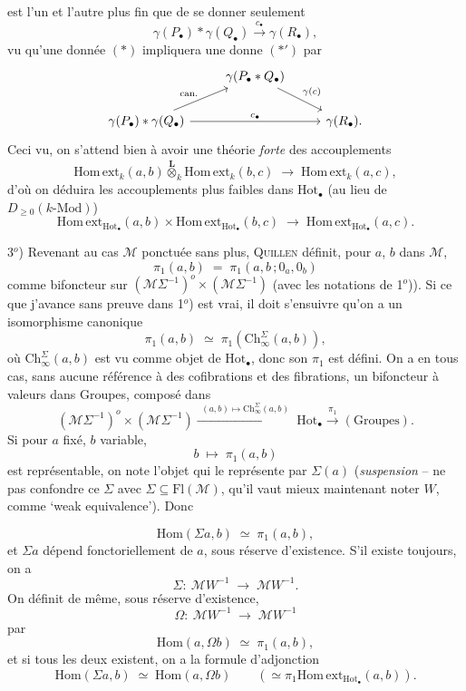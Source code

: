 \documentclass[11pt]{article}
\newcommand{\printedpage}[1]{\marginpar{\footnotesize p.~#1}}
\newcommand{\msp}[1]{\marginpar{\footnotesize [#1]}}
\newcommand{\M}{\mathcal{M}}
\newcommand{\Hot}{\mathrm{Hot}}
\newcommand{\Ch}{\mathrm{Ch}}
\newcommand{\Homext}{\mathrm{Hom\,ext}}
\newcommand{\Lotimes}{\overset{\mathbf{L}}{\otimes}}
\begin{document}
est l'un et l'autre plus fin que de se donner seulement
\[
\gamma(P_{\bullet}) * \gamma(Q_{\bullet}) \xrightarrow{\ c_{\bullet}\ } \gamma(R_{\bullet}), \tag*{$(*')$}
\]
vu qu'une donnée $(*)$ impliquera une donne $(*')$ par %
\[
\begin{tikzcd}
 & \gamma(P_{\bullet} * Q_{\bullet}) \arrow[dr, "\gamma(c)"] & \\
\gamma(P_{\bullet}) * \gamma(Q_{\bullet}) \arrow[ur, "\text{can.}"] \arrow[rr, "c_{\bullet}"] & & \gamma(R_{\bullet}).
\end{tikzcd}
\]
Ceci vu, on s'attend bien à avoir une théorie \textit{forte} des accouplements
\printedpage{13}
\msp{page 21}
\[
\Homext_k(a,b) \Lotimes_k \Homext_k(b,c) \;\longrightarrow\; \Homext_k(a,c),
\]
d'où on déduira les accouplements plus faibles dans $\Hot_{\bullet}$ (au lieu de $D_{\geq 0}(k\text{-Mod})$)
\[
\Homext_{\Hot_{\bullet}}(a,b) \times \Homext_{\Hot_{\bullet}}(b,c) \;\longrightarrow\; \Homext_{\Hot_{\bullet}}(a,c).
\]

3$^o$) Revenant au cas $\M$ ponctuée sans plus, \textsc{Quillen} définit, pour $a$, $b$ dans $\M$,
\[
\pi_1(a,b) \;=\; \pi_1(a,b\,;0_a,0_b)
\]
comme bifoncteur sur $(\M\Sigma^{-1})^o\times(\M\Sigma^{-1})$ (avec les notations de 1$^o$)). Si ce que j'avance sans preuve dans 1$^o$) est vrai, il doit s'ensuivre qu'on a un isomorphisme canonique
\[
\pi_1(a,b) \;\simeq\; \pi_1(\Ch^{\Sigma}_{\infty}(a,b)),
\]
où $\Ch^{\Sigma}_{\infty}(a,b)$ est vu comme objet de $\Hot_{\bullet}$, donc son $\pi_1$ est défini. On a en tous cas, sans aucune référence à des cofibrations et des fibrations, un bifoncteur à valeurs dans Groupes, composé dans
\[
(\M\Sigma^{-1})^o\times(\M\Sigma^{-1}) \xrightarrow{\ \ (a,b)\longmapsto \Ch^{\Sigma}_{\infty}(a,b)\ \ } \Hot_{\bullet} \xrightarrow{\ \pi_1\ } (\text{Groupes}).
\]
Si pour $a$ fixé, $b$ variable,
\[
b \;\longmapsto\; \pi_1(a,b)
\]
est représentable, on note l'objet qui le représente par $\Sigma(a)$ (\textit{suspension} -- ne pas confondre ce $\Sigma$ avec $\Sigma \subseteq \mathrm{Fl}(\M)$, qu'il vaut mieux maintenant noter $W$, comme `weak equivalence'). Donc

\msp{page 22}

\[
\mathrm{Hom}(\Sigma a,b) \;\simeq\; \pi_1(a,b),
\]
et $\Sigma a$ dépend fonctoriellement de $a$, sous réserve d'existence. S'il existe toujours, on a
\[
\Sigma :\ \M W^{-1} \;\longrightarrow\; \M W^{-1}.
\]
On définit de même, sous réserve d'existence,
\[
\Omega :\ \M W^{-1} \;\longrightarrow\; \M W^{-1}
\]
par
\[
\mathrm{Hom}(a,\Omega b) \;\simeq\; \pi_1(a,b),
\]
et si tous les deux existent, on a la formule d'adjonction
\[
\mathrm{Hom}(\Sigma a,b) \;\simeq\; \mathrm{Hom}(a,\Omega b) \qquad (\simeq \pi_1\Homext_{\Hot_{\bullet}}(a,b)).
\]
\end{document}
